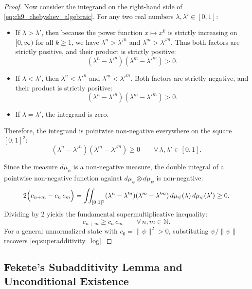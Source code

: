 \begin{proof}
Now consider the integrand on the right-hand side of \eqref{eq:ch9_chebyshev_algebraic}. For any two real numbers $\lambda, \lambda' \in [0, 1]$:
\begin{itemize}
    \item If $\lambda > \lambda'$, then because the power function $x \mapsto x^k$ is strictly increasing on $[0, \infty)$ for all $k \ge 1$, we have $\lambda^n > \lambda'^n$ and $\lambda^m > \lambda'^m$. Thus both factors are strictly positive, and their product is strictly positive:
    \begin{equation}
    (\lambda^n - \lambda'^n)(\lambda^m - \lambda'^m) > 0.
    \end{equation}
    \item If $\lambda < \lambda'$, then $\lambda^n < \lambda'^n$ and $\lambda^m < \lambda'^m$. Both factors are strictly negative, and their product is strictly positive:
    \begin{equation}
    (\lambda^n - \lambda'^n)(\lambda^m - \lambda'^m) > 0.
    \end{equation}
    \item If $\lambda = \lambda'$, the integrand is zero.
\end{itemize}
Therefore, the integrand is pointwise non-negative everywhere on the square $[0, 1]^2$:
\begin{equation}
\label{eq:ch9_pointwise_positivity}
(\lambda^n - \lambda'^n)(\lambda^m - \lambda'^m) \ge 0 \qquad \forall \, \lambda, \lambda' \in [0, 1].
\end{equation}

Since the measure $d\mu_\psi$ is a non-negative measure, the double integral of a pointwise non-negative function against $d\mu_\psi \otimes d\mu_\psi$ is non-negative:
\begin{equation}
2 \Bigl( c_{n+m} - c_n \, c_m \Bigr) = \iint_{[0, 1]^2} (\lambda^n - \lambda'^n)(\lambda^m - \lambda'^m) \, d\mu_\psi(\lambda) \, d\mu_\psi(\lambda') \ge 0.
\end{equation}
Dividing by 2 yields the fundamental supermultiplicative inequality:
\begin{equation}
\label{eq:ch9_supermultiplicative_proven}
c_{n+m} \ge c_n \, c_m \qquad \forall \, n, m \in \mathbb{N}.
\end{equation}
For a general unnormalized state with $c_0 = \|\psi\|^2 > 0$, substituting $\psi / \|\psi\|$ recovers \eqref{eq:superadditivity_log}.
\end{proof}

\subsection{Fekete's Subadditivity Lemma and Unconditional Existence}
\label{subsec:fekete_application_ch9}

